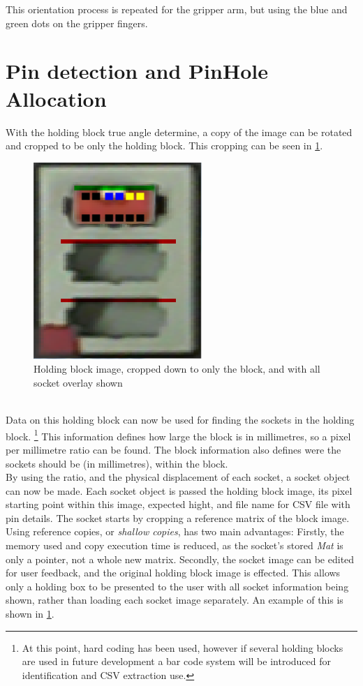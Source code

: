 \documentclass[11pt,a4paper]{report}
\begin{document}
This orientation process is repeated for the gripper arm, but using the blue and green dots on the gripper fingers. 
	
\section{Pin detection and PinHole Allocation}
With the holding block true angle determine, a copy of the image can be rotated and cropped to be only the holding block. This cropping can be seen in \cref{fig:holdingblockwithdata}.
\begin{figure}[h]
	\centering
	\includegraphics[width=0.4\linewidth]{"holding block with data"}
	\caption{Holding block image, cropped down to only the block, and with all socket overlay shown}
	\label{fig:holdingblockwithdata}
\end{figure}\\
Data on this holding block can now be used for finding the sockets in the holding block. \footnote{At this point, hard coding has been used, however if several holding blocks are used in future development a bar code system will be introduced for identification and CSV extraction use.} This information defines how large the block is in millimetres, so a pixel per millimetre ratio can be found. The block information also defines were the sockets should be (in millimetres), within the block.\\
By using the ratio, and the physical displacement of each socket, a socket object can now be made. Each socket object is passed the holding block image, its pixel starting point within this image, expected hight, and file name for CSV file with pin details. The socket starts by cropping a reference matrix of the block image. Using reference copies, or \textit{shallow copies}, has two main advantages: Firstly, the memory used  and copy execution time is reduced, as the socket's stored \textit{Mat} is only a pointer, not a whole new matrix. Secondly, the socket image can be edited for user feedback, and the original holding block image is effected. This allows only a holding box to be presented to the user with all socket information being shown, rather than loading each socket image separately. An example of this is shown in \cref{fig:holdingblockwithdata}. 
\end{document}
